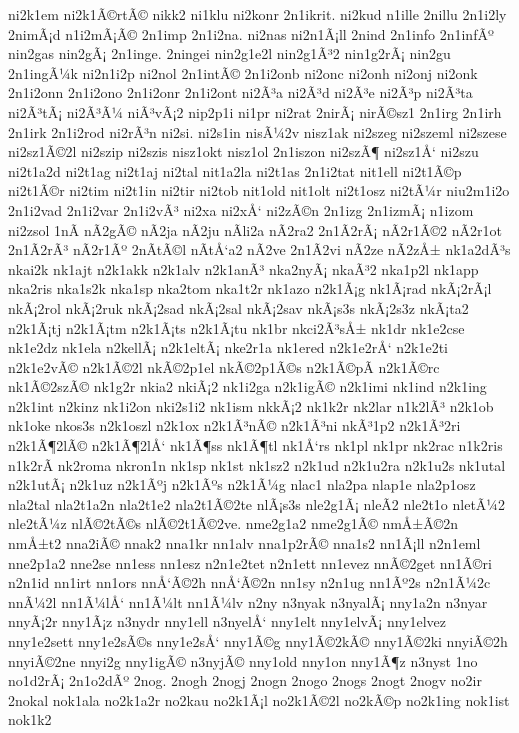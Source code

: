 {ni2k1em
ni2k1Ã©rtÃ©
nikk2
ni1klu
ni2konr
2n1ikrit.
ni2kud
n1ille
2nillu
2n1i2ly
2nimÃ¡d
n1i2mÃ¡Ã©
2n1imp
2n1i2na.
ni2nas
ni2n1Ã¡ll
2nind
2n1info
2n1infÃº
nin2gas
nin2gÃ¡
2n1inge.
2ningei
nin2g1e2l
nin2g1Ã³2
nin1g2rÃ¡
nin2gu
2n1ingÃ¼k
ni2n1i2p
ni2nol
2n1intÃ©
2n1i2onb
ni2onc
ni2onh
ni2onj
ni2onk
2n1i2onn
2n1i2ono
2n1i2onr
2n1i2ont
ni2Ã³a
ni2Ã³d
ni2Ã³e
ni2Ã³p
ni2Ã³ta
ni2Ã³tÃ¡
ni2Ã³Ã¼
niÃ³vÃ¡2
nip2p1i
ni1pr
ni2rat
2nirÃ¡
nirÃ©sz1
2n1irg
2n1irh
2n1irk
2n1i2rod
ni2rÃ³n
ni2si.
ni2s1in
nisÃ¼2v
nisz1ak
ni2szeg
ni2szeml
ni2szese
ni2sz1Ã©2l
ni2szip
ni2szis
nisz1okt
nisz1ol
2n1iszon
ni2szÃ¶
ni2sz1Å‘
ni2szu
ni2t1a2d
ni2t1ag
ni2t1aj
ni2tal
nit1a2la
ni2t1as
2n1i2tat
nit1ell
ni2t1Ã©p
ni2t1Ã©r
ni2tim
ni2t1in
ni2tir
ni2tob
nit1old
nit1olt
ni2t1osz
ni2tÃ¼r
niu2m1i2o
2n1i2vad
2n1i2var
2n1i2vÃ³
ni2xa
ni2xÅ‘
ni2zÃ©n
2n1izg
2n1izmÃ¡
n1izom
ni2zsol
1nÃ­
nÃ­2gÃ©
nÃ­2ja
nÃ­2ju
nÃ­li2a
nÃ­2ra2
2n1Ã­2rÃ¡
nÃ­2r1Ã©2
nÃ­2r1ot
2n1Ã­2rÃ³
nÃ­2r1Ãº
2nÃ­tÃ©l
nÃ­tÅ‘a2
nÃ­2ve
2n1Ã­2vi
nÃ­2ze
nÃ­2zÅ±
nk1a2dÃ³s
nkai2k
nk1ajt
n2k1akk
n2k1alv
n2k1anÃ³
nka2nyÃ¡
nkaÃ³2
nka1p2l
nk1app
nka2ris
nka1s2k
nka1sp
nka2tom
nka1t2r
nk1azo
n2k1Ã¡g
nk1Ã¡rad
nkÃ¡2rÃ¡l
nkÃ¡2rol
nkÃ¡2ruk
nkÃ¡2sad
nkÃ¡2sal
nkÃ¡2sav
nkÃ¡s3s
nkÃ¡2s3z
nkÃ¡ta2
n2k1Ã¡tj
n2k1Ã¡tm
n2k1Ã¡ts
n2k1Ã¡tu
nk1br
nkci2Ã³sÅ±
nk1dr
nk1e2cse
nk1e2dz
nk1ela
n2kellÃ¡
n2k1eltÃ¡
nke2r1a
nk1ered
n2k1e2rÅ‘
n2k1e2ti
n2k1e2vÃ©
n2k1Ã©2l
nkÃ©2p1el
nkÃ©2p1Ã©s
n2k1Ã©pÃ­
n2k1Ã©rc
nk1Ã©2szÃ©
nk1g2r
nkia2
nkiÃ¡2
nk1i2ga
n2k1igÃ©
n2k1imi
nk1ind
n2k1ing
n2k1int
n2kinz
nk1i2on
nki2s1i2
nk1ism
nkkÃ¡2
nk1k2r
nk2lar
n1k2lÃ³
n2k1ob
nk1oke
nkos3s
n2k1oszl
n2k1ox
n2k1Ã³nÃ©
n2k1Ã³ni
nkÃ³1p2
n2k1Ã³2ri
n2k1Ã¶2lÃ©
n2k1Ã¶2lÅ‘
nk1Ã¶ss
nk1Ã¶tl
nk1Å‘rs
nk1pl
nk1pr
nk2rac
n1k2ris
n1k2rÃ­
nk2roma
nkron1n
nk1sp
nk1st
nk1sz2
n2k1ud
n2k1u2ra
n2k1u2s
nk1utal
n2k1utÃ¡
n2k1uz
n2k1Ãºj
n2k1Ãºs
n2k1Ã¼g
nlac1
nla2pa
nlap1e
nla2p1osz
nla2tal
nla2t1a2n
nla2t1e2
nla2t1Ã©2te
nlÃ¡s3s
nle2g1Ã¡
nleÃ­2
nle2t1o
nletÃ¼2
nle2tÃ¼z
nlÃ©2tÃ©s
nlÃ©2t1Ã©2ve.
nme2g1a2
nme2g1Ã©
nmÅ±Ã©2n
nmÅ±t2
nna2iÃ©
nnak2
nna1kr
nn1alv
nna1p2rÃ©
nna1s2
nn1Ã¡ll
n2n1eml
nne2p1a2
nne2se
nn1ess
nn1esz
n2n1e2tet
n2n1ett
nn1evez
nnÃ©2get
nn1Ã©ri
n2n1id
nn1irt
nn1ors
nnÅ‘Ã©2h
nnÅ‘Ã©2n
nn1sy
n2n1ug
nn1Ãº2s
n2n1Ã¼2c
nnÃ¼2l
nn1Ã¼lÅ‘
nn1Ã¼lt
nn1Ã¼lv
n2ny
n3nyak
n3nyalÃ¡
nny1a2n
n3nyar
nnyÃ¡2r
nny1Ã¡z
n3nydr
nny1ell
n3nyelÅ‘
nny1elt
nny1elvÃ¡
nny1elvez
nny1e2sett
nny1e2sÃ©s
nny1e2sÅ‘
nny1Ã©g
nny1Ã©2kÃ©
nny1Ã©2ki
nnyiÃ©2h
nnyiÃ©2ne
nnyi2g
nny1igÃ©
n3nyjÃ©
nny1old
nny1on
nny1Ã¶z
n3nyst
1no
no1d2rÃ¡
2n1o2dÃº
2nog.
2nogh
2nogj
2nogn
2nogo
2nogs
2nogt
2nogv
no2ir
2nokal
nok1ala
no2k1a2r
no2kau
no2k1Ã¡l
no2k1Ã©2l
no2kÃ©p
no2k1ing
nok1ist
nok1k2
}

